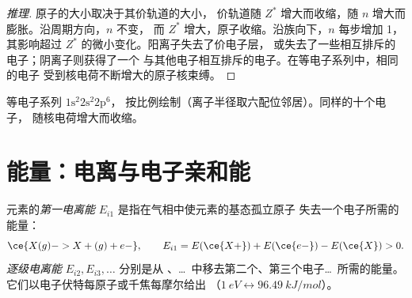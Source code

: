 \begin{proof}[推理]
原子的大小取决于其价轨道的大小，
价轨道随 $Z^{*}$ 增大而收缩，随 $n$ 增大而膨胀。沿周期方向，$n$ 不变，
而 $Z^{*}$ 增大，原子收缩。沿族向下，$n$ 每步增加 1，
其影响超过 $Z^{*}$ 的微小变化。阳离子失去了价电子层，
或失去了一些相互排斥的电子；阴离子则获得了一个
与其他电子相互排斥的电子。在等电子系列中，相同的电子
受到核电荷不断增大的原子核束缚。
\end{proof}

\begin{omfigure}

{\small 等电子系列 $1\text{s}^2 2\text{s}^2 2\text{p}^6$，
按比例绘制（离子半径取六配位邻居）。同样的十个电子，
随核电荷增大而收缩。}
\end{omfigure}

\section{能量：电离与电子亲和能}

\begin{definition}[电离能]\label{def:b1:periodicity:ionisation-energy}
元素的\emph{第一电离能} $E_{i1}$
是指在气相中使元素的基态孤立原子
失去一个电子所需的能量：
\[
  \ce{X(g) -> X+(g) + e-}, \qquad E_{i1} = E(\ce{X+}) + E(\ce{e-}) - E(\ce{X}) > 0 .
\]
\emph{逐级电离能}
$E_{i2}, E_{i3}, \dots$ 分别是从
、\dots\ 中移去第二个、第三个电子\dots\ 所需的能量。
它们以电子伏特每原子或千焦每摩尔给出
（$\qty{1}{eV} \leftrightarrow \qty{96.49}{kJ/mol}$）。
\end{definition}

